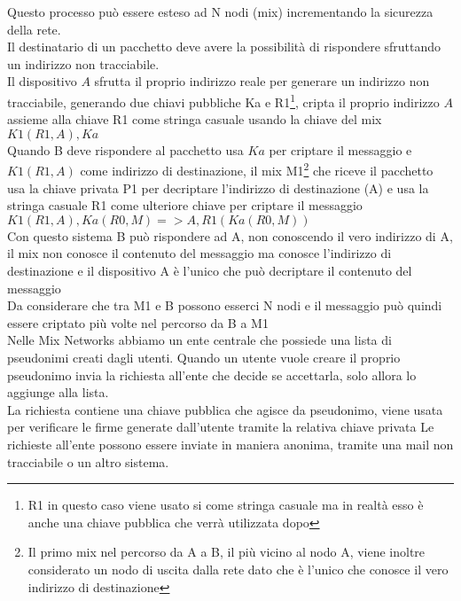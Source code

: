 Questo processo può essere esteso ad N nodi (mix) incrementando la sicurezza della rete. \\
\newline
Il destinatario di un pacchetto deve avere la possibilità di rispondere sfruttando un indirizzo non tracciabile. \\
Il dispositivo $A$ sfrutta il proprio indirizzo reale per generare un indirizzo non tracciabile, generando due chiavi pubbliche Ka e R1\footnote{R1 in questo caso viene usato si come stringa casuale ma in realtà esso è anche una chiave pubblica che verrà utilizzata dopo}, cripta il proprio indirizzo $A$ assieme alla chiave R1 come stringa casuale usando la chiave del mix \\
$K1(R1, A), Ka$ \\
Quando B deve rispondere al pacchetto usa $Ka$ per criptare il messaggio e $K1(R1, A)$ come indirizzo di destinazione, il mix M1\footnote{Il primo mix nel percorso da A a B, il più vicino al nodo A, viene inoltre considerato un nodo di uscita dalla rete dato che è l'unico che conosce il vero indirizzo di destinazione} che riceve il pacchetto usa la chiave privata P1 per decriptare l'indirizzo di destinazione (A) e usa la stringa casuale R1 come ulteriore chiave per criptare il messaggio \\
$K1( R1, A ), Ka( R0, M ) => A, R1( Ka( R0, M ) )$ \\
Con questo sistema B può rispondere ad A, non conoscendo il vero indirizzo di A, il mix non conosce il contenuto del messaggio ma conosce l'indirizzo di destinazione e il dispositivo A è l'unico che può decriptare il contenuto del messaggio \\
Da considerare che tra M1 e B possono esserci N nodi e il messaggio può quindi essere criptato più volte nel percorso da B a M1 \\
Nelle Mix Networks abbiamo un ente centrale che possiede una lista di pseudonimi creati dagli utenti. 
Quando un utente vuole creare il proprio pseudonimo invia la richiesta all'ente che decide se accettarla, solo allora lo aggiunge alla lista. \\
La richiesta contiene una chiave pubblica che agisce da pseudonimo, viene usata per verificare le firme generate dall'utente tramite la relativa chiave privata 
Le richieste all'ente possono essere inviate in maniera anonima, tramite una mail non tracciabile o un altro sistema. \\
\cite{ChaumMixes}

